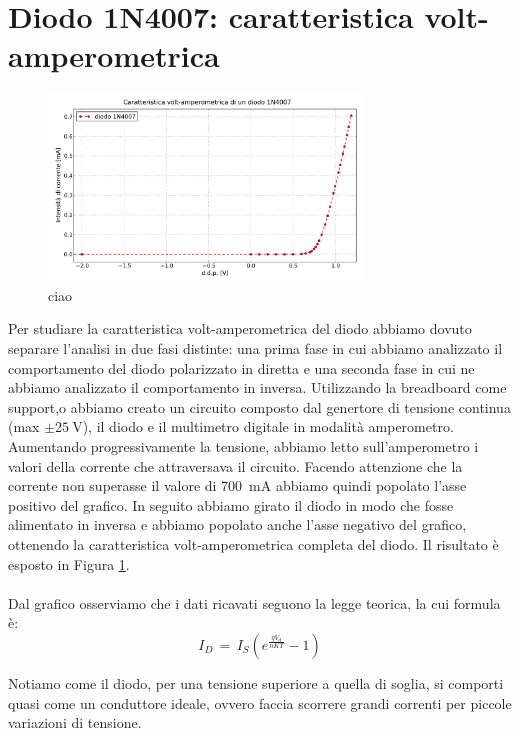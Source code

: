 \section{Diodo 1N4007: caratteristica volt-amperometrica}

\begin{figure}
	\caption{ciao}
	\label{fig:diodo}
	\includegraphics[width=0.75\textwidth]{diodo.pdf}
\end{figure}

Per studiare la caratteristica volt-amperometrica del diodo abbiamo dovuto separare l'analisi in due fasi distinte: una prima fase in cui abbiamo analizzato il comportamento del diodo polarizzato in diretta e una seconda fase in cui ne abbiamo analizzato il comportamento in inversa.
Utilizzando la breadboard come support,o abbiamo creato un circuito composto dal genertore di tensione continua (max $\pm \SI{25}{\volt}$), il diodo e il multimetro digitale in modalità amperometro. Aumentando progressivamente la tensione, abbiamo letto sull'amperometro i valori della corrente che attraversava il circuito.
Facendo attenzione che la corrente non superasse il valore di \SI{700}{\milli\ampere} abbiamo quindi popolato l'asse positivo del grafico. In seguito abbiamo girato il diodo in modo che fosse alimentato in inversa e abbiamo popolato anche l'asse negativo del grafico, ottenendo la caratteristica volt-amperometrica completa del diodo. Il risultato è esposto in Figura \ref{fig:diodo}.
\\
\\
Dal grafico osserviamo che i dati ricavati seguono la legge teorica, la cui formula è:
\begin{equation}
I_{D} \, = \, I_{S} \left( e^{\frac{q V_d}{nKT}} -1 \right)
\label{eq:diode}
\end{equation}

Notiamo come il diodo, per una tensione superiore a quella di soglia, si comporti quasi come un conduttore ideale, ovvero faccia scorrere grandi correnti per piccole variazioni di tensione. 

